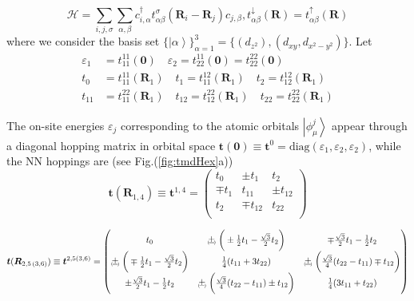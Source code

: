 \begin{equation}
\mathcal{H} = \sum_{i, j, \sigma} \sum_{\alpha, \beta} c_{i,\alpha}^\dagger t_{\alpha \beta}^\sigma ( \bm R_i - \bm R_j ) c_{j, \beta} , t_{\alpha \beta}^\downarrow ( \bm R ) = t_{\alpha \beta}^\uparrow ( \bm R )
\end{equation}
where we consider the basis set $\{ \left| \alpha \right\rangle \}_{\alpha = 1}^3 = \{ (d_{z^2}) , (d_{x y}, d_{ x^2 - y^2 }) \} $.
Let 
\begin{equation*}
\begin{split}
\varepsilon_1 &= t_{11}^{11} ( \bm 0 ) \quad \varepsilon_2 = t_{22}^{11} ( \bm 0 ) = t_{22}^{22} ( \bm 0 ) \\
t_0 &= t_{11}^{11} ( \bm R_1 ) \quad t_1 = t_{11}^{12} ( \bm R_1 ) \quad t_2 = t_{12}^{12} ( \bm R_1 ) \\
t_{11} &= t_{11}^{22} ( \bm R_1 ) \quad t_{12} = t_{12}^{22} ( \bm R_1 ) \quad t_{22} = t_{22}^{22} ( \bm R_1 )
\end{split}
\end{equation*}

The on-site energies $\varepsilon_j$ corresponding to the atomic orbitals $\left| \phi_\mu^j \right\rangle$ appear through a diagonal hopping matrix in orbital space $\bm t ( \bm 0 ) \equiv \bm t^0 = \text{diag} ( \varepsilon_1, \varepsilon_2, \varepsilon_2 )$, while the NN hoppings are (see Fig.(\ref{fig:tmdHex}a))
\begin{equation}
\bm t (\bm R_{1, 4}) \equiv \bm t^{1, 4} =
\begin{pmatrix}
t_0 & \pm t_1 & t_2 \\
\mp t_1 & t_{11} & \pm t_{12} \\
t_2 & \mp t_{12} & t_{22} \\
\end{pmatrix}
\end{equation}
\begin{strip}
\begin{equation}
\bm t (\bm R_{2,5\,(3,6)})  \equiv \bm t^{2, 5 (3, 6)}  =
\begin{pmatrix}
t_0 & \Pm \bigg( \pm \frac{1}{2} t_1 - \frac{\sqrt{3}}{2} t_2 \bigg) & \mp \frac{\sqrt{3}}{2} t_1 - \frac{1}{2} t_2 \\
\Pm \bigg( \mp \frac{1}{2} t_1 - \frac{\sqrt{3}}{2} t_2 \bigg) & \frac{1}{4} ( t_{11} + 3 t_{22} ) & \Pm \bigg( \frac{\sqrt{3}}{4} ( t_{22} - t_{11} ) \mp t_{12} \bigg) \\
\pm \frac{\sqrt{3}}{2} t_1 - \frac{1}{2} t_2 & \Pm \bigg( \frac{\sqrt{3}}{4} ( t_{22} - t_{11} ) \pm t_{12} \bigg) & \frac{1}{4} ( 3 t_{11} + t_{22} )
\end{pmatrix}
\end{equation}
\end{strip}

